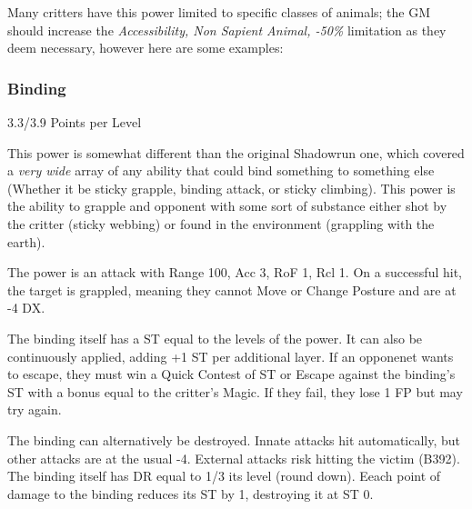 \begin{multicols*}{3}
	Many critters have this power limited to specific classes of animals; the GM should increase the \textit{Accessibility, Non Sapient Animal, -50\%} limitation as they deem necessary, however here are some examples:
	
	
	\begin{center}
		\begin{adjustwidth}{-4mm}{}
		\end{adjustwidth}
	\end{center}
	
	
	\subsubsection{Binding}\label{binding}
	\begin{flushright}
		3.3/3.9 Points per Level
	\end{flushright}
	
	This power is somewhat different than the original Shadowrun one, which covered a \textit{very wide} array of any ability that could bind something to something else (Whether it be sticky grapple, binding attack, or sticky climbing). This power is the ability to grapple and opponent with some sort of substance either shot by the critter (sticky webbing) or found in the environment (grappling with the earth).
	
	The power is an attack with Range 100, Acc 3, RoF 1, Rcl 1. On a successful hit, the target is grappled, meaning they cannot Move or Change Posture and are at -4 DX. 
	
	The binding itself has a ST equal to the levels of the power. It can also be continuously applied, adding +1 ST per additional layer. If an opponenet wants to escape, they must win a Quick Contest of ST or Escape against the binding's ST with a bonus equal to the critter's Magic. If they fail, they lose 1 FP but may try again. 
	
	The binding can alternatively be destroyed. Innate attacks hit automatically, but other attacks are at the usual -4. External attacks risk hitting the victim (B392). The binding itself has DR equal to 1/3 its level (round down). Eeach point of damage to the binding reduces its ST by 1, destroying it at ST 0.
	

\end{multicols*}
